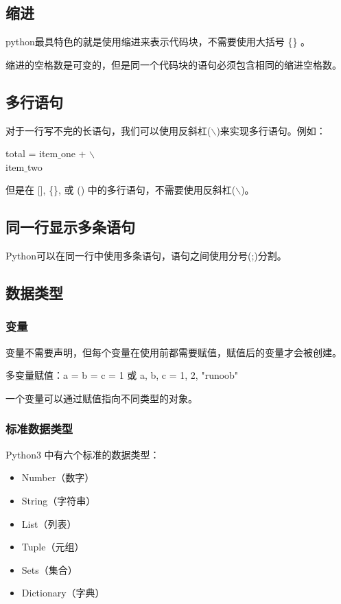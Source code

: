 \documentclass{article}
\begin{document}
\subsection{缩进}
python最具特色的就是使用缩进来表示代码块，不需要使用大括号 \{\} 。

缩进的空格数是可变的，但是同一个代码块的语句必须包含相同的缩进空格数。
\subsection{多行语句}
对于一行写不完的长语句，我们可以使用反斜杠($\backslash$)来实现多行语句。例如：
\begin{center}
total = item$\_$one + $\backslash$ \\
        item$\_$two
\end{center}
但是在 [], \{\}, 或 () 中的多行语句，不需要使用反斜杠($\backslash$)。

\subsection{同一行显示多条语句}
Python可以在同一行中使用多条语句，语句之间使用分号(;)分割。

\subsection{数据类型}
\subsubsection{变量}
变量不需要声明，但每个变量在使用前都需要赋值，赋值后的变量才会被创建。

多变量赋值：a = b = c = 1 或 a, b, c = 1, 2, "runoob"

一个变量可以通过赋值指向不同类型的对象。


\subsubsection{标准数据类型}
Python3 中有六个标准的数据类型：
\begin{itemize}
\item Number（数字）
\item String（字符串）
\item List（列表）
\item Tuple（元组）
\item Sets（集合）
\item Dictionary（字典）
\end{itemize}
\end{document}
